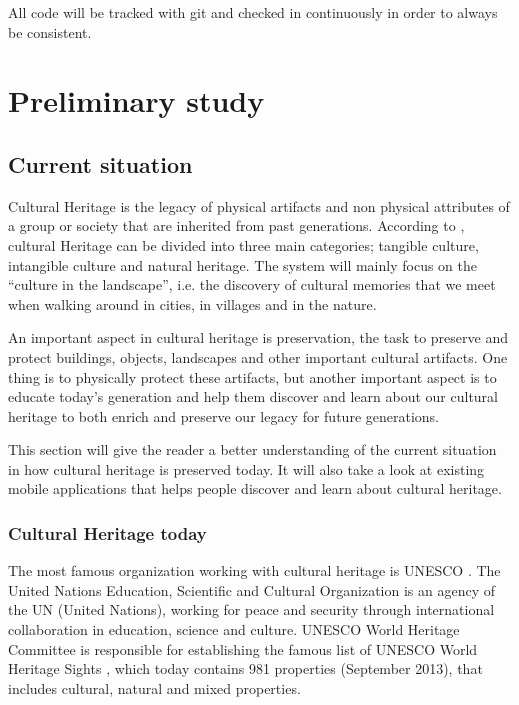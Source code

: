 \documentclass[11pt]{book}
\begin{document}
All code will be tracked with git and checked in continuously in order to always be consistent.

\chapter{Preliminary study}

\section{Current situation}
Cultural Heritage is the legacy of physical artifacts and non physical attributes of a group or society that are inherited from past generations. According to \cite{CiD:culturalheritage}, cultural Heritage can be divided into three main categories; tangible culture, intangible culture and natural heritage. The system will mainly focus on the ``culture in the landscape'', i.e. the discovery of cultural memories that we meet when walking around in cities, in villages and in the nature.

An important aspect in cultural heritage is preservation, the task to preserve and protect buildings, objects, landscapes and other important cultural artifacts. One thing is to physically protect these artifacts, but another important aspect is to educate today's generation and help them discover and learn about our cultural heritage to both enrich and preserve our legacy for future generations.

This section will give the reader a better understanding of the current situation in how cultural heritage is preserved today. It will also take a look at existing mobile applications that helps people discover and learn about cultural heritage.

\subsection{Cultural Heritage today}
The most famous organization working with cultural heritage is UNESCO \cite{UNESCO:intro}. The United Nations Education, Scientific and Cultural Organization is an agency of the UN (United Nations), working for peace and security through international collaboration in education, science and culture. UNESCO World Heritage Committee is responsible for establishing  the famous list of UNESCO World Heritage Sights \cite{UNESCO:worldheritage}, which today contains 981 properties (September 2013), that includes cultural, natural and mixed properties.
\end{document}
